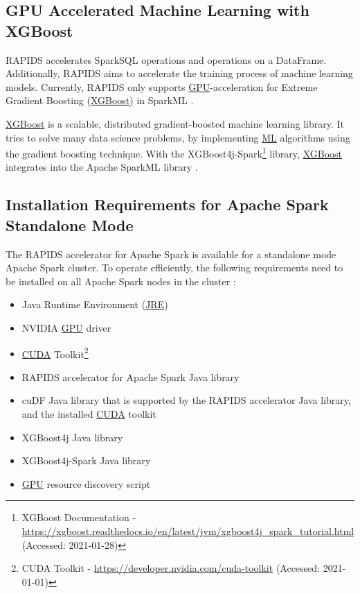 \subsection{GPU Accelerated Machine Learning with XGBoost}
RAPIDS accelerates SparkSQL operations and operations on a DataFrame. Additionally, RAPIDS aims to accelerate the training process of machine learning models.
Currently, RAPIDS only supports \hyperlink{abbr:gpu}{GPU}-acceleration for Extreme Gradient Boosting (\hyperlink{abbr:xgboost}{XGBoost}) in SparkML \cite{Mcdonald2020SparkRapids}.


\hyperlink{abbr:xgboost}{XGBoost} is a scalable, distributed gradient-boosted machine learning library. It tries to solve many data science problems, by implementing \hyperlink{abbr:ml}{ML} algorithms using the gradient boosting technique.
With the XGBoost4j-Spark\footnote{XGBoost Documentation - \url{https://xgboost.readthedocs.io/en/latest/jvm/xgboost4j_spark_tutorial.html} (Accessed: 2021-01-28)} library, \hyperlink{abbr:xgboost}{XGBoost} integrates into the Apache SparkML library \cite{XGBoost2021Docs}. 


\subsection{Installation Requirements for Apache Spark Standalone Mode}
\label{subsec:04_rapids_req}
The RAPIDS accelerator for Apache Spark is available for a standalone mode Apache Spark cluster. To operate efficiently, the following requirements need to be installed on all Apache Spark nodes in the cluster \cite{SparkRapids2020Docs}:
\begin{itemize}
\item Java Runtime Environment (\hyperlink{abbr:jre}{JRE})
\item NVIDIA \hyperlink{abbr:gpu}{GPU} driver
\item \hyperlink{abbr:cuda}{CUDA} Toolkit\footnote{CUDA Toolkit - \url{https://developer.nvidia.com/cuda-toolkit} (Accessed: 2021-01-01)}
\item RAPIDS accelerator for Apache Spark Java library
\item cuDF Java library that is supported by the RAPIDS accelerator Java library, and the installed \hyperlink{abbr:cuda}{CUDA} toolkit
\item XGBoost4j Java library
\item XGBoost4j-Spark Java library
\item \hyperlink{abbr:gpu}{GPU} resource discovery script
\end{itemize}


